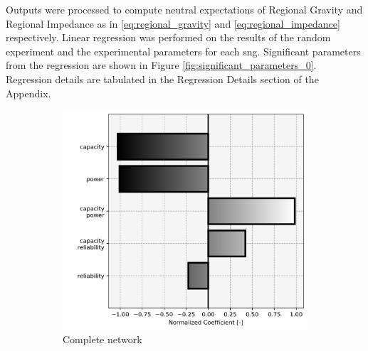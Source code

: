\begin{multicols}{2}
Outputs were processed to compute neutral expectations of Regional Gravity and Regional Impedance as in \eqref{eq:regional_gravity} and \eqref{eq:regional_impedance} respectively. Linear regression was performed on the results of the random experiment and the experimental parameters for each \gls{sng}. Significant parameters from the regression are shown in Figure \ref{fig:significant_parameters_0}. Regression details are tabulated in the Regression Details section of the Appendix. 

\end{multicols}

\begin{figure}[H]
	\centering

\begin{subfigure}[t]{.33\linewidth}
	\centering\captionsetup{width = .8\linewidth}
	\includegraphics[width = \linewidth]{figs/significant_parameters_0.png}
	\caption{Complete network}
\end{subfigure}%
\begin{subfigure}[t]{.33\linewidth}
	\centering\captionsetup{width = .8\linewidth}

\end{subfigure}
\end{figure}
